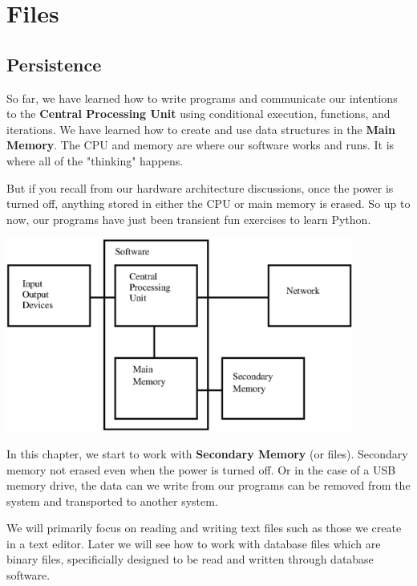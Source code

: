 \documentclass[10pt]{book}
\begin{document}
\chapter{Files}



\section{Persistence}


So far, we have learned how to write programs and communicate 
our intentions to the {\bf Central Processing Unit} using conditional
execution, functions, and iterations.  We have learned how to 
create and use data structures in the {\bf Main Memory}.  The CPU 
and memory are where our software works and runs.  It is where 
all of the "thinking" happens.  

But if you recall from our hardware architecture discussions,
once the power is turned off, anything stored in either
the CPU or main memory is erased.  So up to now, our
programs have just been transient fun exercises to learn Python.

\beforefig
\centerline{\includegraphics[height=2.50in]{figs2/arch3.eps}}
\afterfig

In this chapter, we start to work with {\bf Secondary Memory} 
(or files).
Secondary memory not erased even when the power is turned off.  
Or in the case of a USB memory drive, the
data can we write from our programs can be removed from the 
system and transported to another system.

We will primarily focus on reading and writing text files such as 
those we create in a text editor.  Later we will see how to work
with database files which are binary files, specificially designed to be read
and written through database software.
\end{document}
